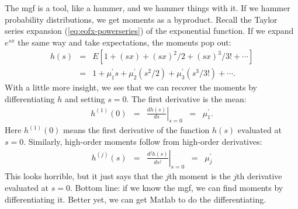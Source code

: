 \documentclass[11pt]{article}
\begin{document}
The mgf is a tool, like a hammer, and we hammer things with it.
If we hammer probability distributions, we get moments as a byproduct.
Recall the Taylor series expansion (\ref{eq:eofx-powerseries}) of the exponential function.
If we expand $e^{sx}$ the same way and take expectations,
the moments pop out:
\begin{eqnarray*}
    h(s) &=& E \left[ 1 + (sx) + (sx)^2/2 + (sx)^3/3! + \cdots \right] \\
            &=&  1 + \mu_1^\prime s + \mu_2^\prime (s^2/2)  + \mu_3^\prime (s^3/3!)  + \cdots .
\end{eqnarray*}
With a little more insight, we see that we can recover the moments by differentiating
$h$ and setting $s=0$.
The first derivative is the mean:
\begin{eqnarray*}
    h^{(1)} (0)  &=& \left. \frac{ d h(s)}{d s} \right|_{s=0}
            \;\;=\;\;  \mu_1^\prime .
\end{eqnarray*}
Here $h^{(1)}(0)$ means the first derivative of the function $h(s)$ evaluated at
$s=0$.
Similarly, high-order moments follow from high-order derivatives:
\begin{eqnarray*}
    h^{(j)} (s)  &=& \left. \frac{d^j h(s)}{d s^j} \right|_{s=0}
            \;\;=\;\;  \mu_j^\prime
\end{eqnarray*}
This looks horrible, but it just says that the $j$th moment is the $j$th derivative
evaluated at $s=0$.
Bottom line:  if we know the mgf, we can find moments by differentiating it.
Better yet, we can get Matlab to do the differentiating.
\end{document}
